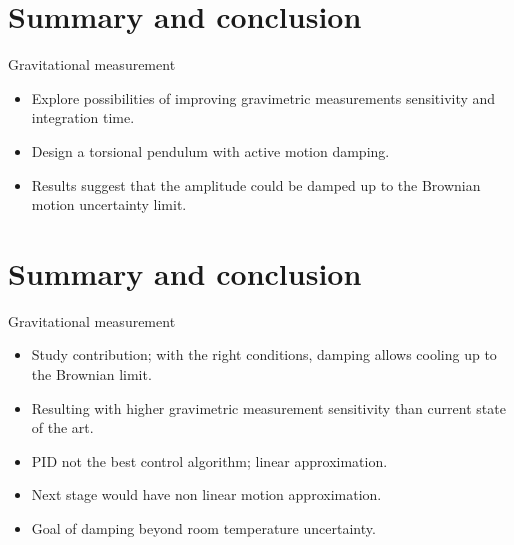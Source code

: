 \documentclass{beamer}
\begin{document}
\section{Summary and conclusion}
\begin{frame}{Gravitational measurement}
	\begin{itemize}
		\framesubtitle{Study achievements}
		
		\item Explore possibilities of improving gravimetric measurements sensitivity and integration time. 
		\item Design a torsional pendulum with active motion damping. 
		\pause
		\item Results suggest that the amplitude could be damped up to the Brownian motion uncertainty limit. 
		
		
	\end{itemize}
\end{frame}

\section{Summary and conclusion}
\begin{frame}{Gravitational measurement}
	\begin{itemize}
		\framesubtitle{Study contribution}
		
		
		
		\item Study contribution; with the right conditions, damping allows cooling up to the Brownian limit. 
		\item Resulting with higher gravimetric measurement sensitivity than current state of the art.
		\pause
		\item PID not the best control algorithm; linear approximation. 
		\item Next stage would have non linear motion approximation.
		\item Goal of damping beyond room temperature uncertainty. 
	\end{itemize}
\end{frame}
\end{document}
